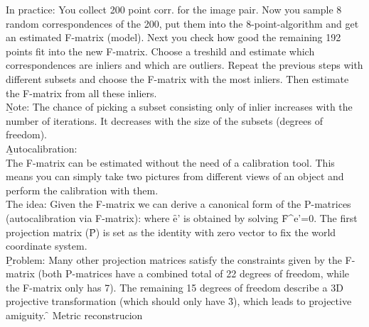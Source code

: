 In practice: You collect 200 point corr. for the image pair. Now you sample 8 random correspondences of the 200, put them into the 8-point-algorithm and get an estimated F-matrix (model). Next you check how good the remaining 192 points fit into the new F-matrix. Choose a treshild and estimate which correspondences are inliers and which are outliers. Repeat the previous steps with different subsets and choose the F-matrix with the most inliers. Then estimate the F-matrix from all these inliers.\\

\b{Note:} The chance of picking a subset consisting only of inlier increases with the number of iterations. It decreases with the size of the subsets (degrees of freedom).\\

\b{Autocalibration:\\[0.5em]}
The F-matrix can be estimated without the need of a calibration tool. This means you can simply take two pictures from different views of an object and perform the calibration with them.\\
The idea: Given the F-matrix we can derive a canonical form of the P-matrices (autocalibration via F-matrix):
where \f{e'} is obtained by solving \f{F^\top e'=0}. The first projection matrix (\f{P}) is set as the identity with zero vector to fix the world coordinate system.\\
\b{Problem:} Many other projection matrices satisfy the constraints given by the F-matrix (both P-matrices have a combined total of 22 degrees of freedom, while the F-matrix only has 7). The remaining 15 degrees of freedom describe a 3D projective transformation (which should only have \f{3}), which leads to \b{projective amiguity}. \f{\to} Metric reconstrucion

